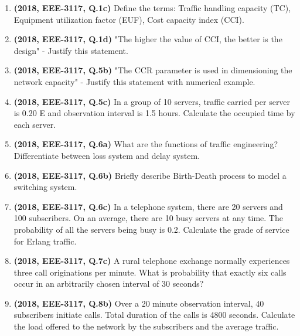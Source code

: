 \documentclass[12pt, a4paper]{article}
\begin{document}
\begin{enumerate}
		\item \textbf{(2018, EEE-3117, Q.1c)} Define the terms: Traffic handling capacity (TC), Equipment utilization factor (EUF), Cost capacity index (CCI).
		\item \textbf{(2018, EEE-3117, Q.1d)} "The higher the value of CCI, the better is the design" - Justify this statement.
		\item \textbf{(2018, EEE-3117, Q.5b)} "The CCR parameter is used in dimensioning the network capacity" - Justify this statement with numerical example.
		\item \textbf{(2018, EEE-3117, Q.5c)} In a group of 10 servers, traffic carried per server is 0.20 E and observation interval is 1.5 hours. Calculate the occupied time by each server.
		\item \textbf{(2018, EEE-3117, Q.6a)} What are the functions of traffic engineering? Differentiate between loss system and delay system.
		\item \textbf{(2018, EEE-3117, Q.6b)} Briefly describe Birth-Death process to model a switching system.
		\item \textbf{(2018, EEE-3117, Q.6c)} In a telephone system, there are 20 servers and 100 subscribers. On an average, there are 10 busy servers at any time. The probability of all the servers being busy is 0.2. Calculate the grade of service for Erlang traffic.
		\item \textbf{(2018, EEE-3117, Q.7c)} A rural telephone exchange normally experiences three call originations per minute. What is probability that exactly six calls occur in an arbitrarily chosen interval of 30 seconds?
		\item \textbf{(2018, EEE-3117, Q.8b)} Over a 20 minute observation interval, 40 subscribers initiate calls. Total duration of the calls is 4800 seconds. Calculate the load offered to the network by the subscribers and the average traffic.
		

\end{enumerate}
\end{document}
